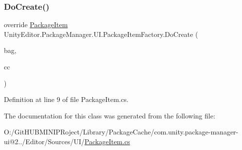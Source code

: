 \subsubsection{\texorpdfstring{DoCreate()}{DoCreate()}}
{\footnotesize\ttfamily override \mbox{\hyperlink{class_unity_editor_1_1_package_manager_1_1_u_i_1_1_package_item}{Package\+Item}} Unity\+Editor.\+Package\+Manager.\+U\+I.\+Package\+Item\+Factory.\+Do\+Create (\begin{DoxyParamCaption}\item[{I\+Uxml\+Attributes}]{bag,  }\item[{Creation\+Context}]{cc }\end{DoxyParamCaption})\hspace{0.3cm}{\ttfamily [protected]}}



Definition at line 9 of file Package\+Item.\+cs.



The documentation for this class was generated from the following file\+:\begin{DoxyCompactItemize}
\item 
O\+:/\+Git\+H\+U\+B\+M\+I\+N\+I\+P\+Roject/\+Library/\+Package\+Cache/com.\+unity.\+package-\/manager-\/ui@2../\+Editor/\+Sources/\+U\+I/\mbox{\hyperlink{_package_item_8cs}{Package\+Item.\+cs}}\end{DoxyCompactItemize}
